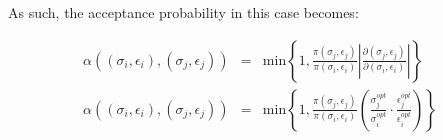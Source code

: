 \documentclass[12pt]{minimal}
\begin{document}
As such, the acceptance probability in this case becomes:

\begin{eqnarray}
\alpha((\sigma_i, \epsilon_i),(\sigma_j, \epsilon_j)) & = & \mathrm{min} \left \{ 1, \frac{\pi(\sigma_j, \epsilon_j)}{\pi(\sigma_i, \epsilon_i)} \left | \frac{\partial(\sigma_j, \epsilon_j)}{\partial(\sigma_i, \epsilon_i)} \right | \right \}\\
\alpha((\sigma_i, \epsilon_i),(\sigma_j, \epsilon_j)) & = & \mathrm{min} \left \{ 1, \frac{\pi(\sigma_j, \epsilon_j)}{\pi(\sigma_i, \epsilon_i)} \left ( \frac{\sigma^{opt}_j}{\sigma^{opt}_i} \cdot \frac{\epsilon^{opt}_j}{\epsilon^{opt}_i} \right ) \right \}\\
\end{eqnarray}
\end{document}
